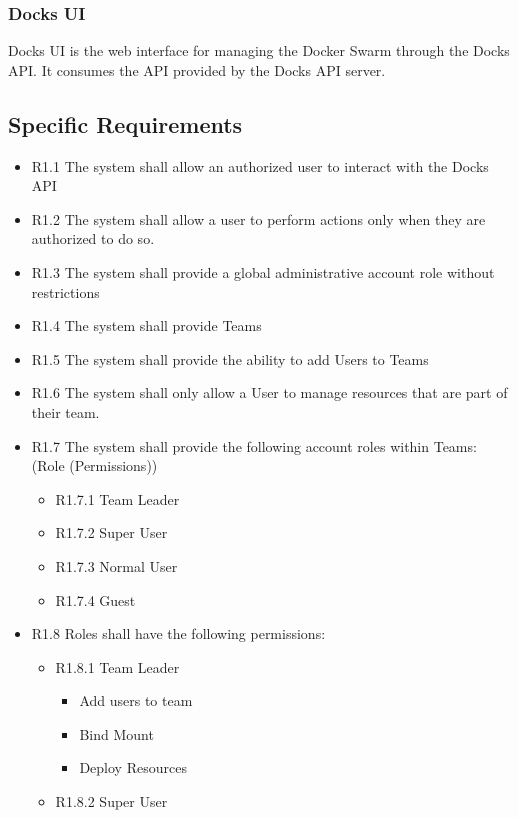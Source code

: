 \documentclass[]{article}
\begin{document}
\subsubsection{Docks UI}
Docks UI is the web interface for managing the Docker Swarm through the Docks API. 
It consumes the API provided by the Docks API server.

\subsection{Specific Requirements}

\begin{itemize}
	\item R1.1 The system shall allow an authorized user to interact with the Docks API
	\item R1.2 The system shall allow a user to perform actions only when they are authorized to do so.
	\item R1.3 The system shall provide a global administrative account role without restrictions
	\item R1.4 The system shall provide Teams
	\item R1.5 The system shall provide the ability to add Users to Teams
	\item R1.6 The system shall only allow a User to manage resources that are part of their team.
	\item R1.7 The system shall provide the following account roles within Teams: (Role (Permissions))
	      \begin{itemize}
		      \item R1.7.1 Team Leader
		      \item R1.7.2 Super User
		      \item R1.7.3 Normal User
		      \item R1.7.4 Guest
	      \end{itemize}
	\item R1.8 Roles shall have the following permissions:
	      \begin{itemize}
		      \item R1.8.1 Team Leader
		            \begin{itemize}
			            \item Add users to team
			            \item Bind Mount
			            \item Deploy Resources
		            \end{itemize}
		      \item R1.8.2 Super User

\end{itemize}
\end{itemize}
\end{document}
